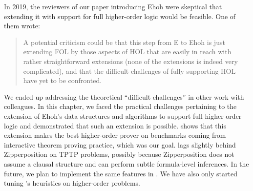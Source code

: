  In 2019, the reviewers of our paper introducing Ehoh \cite{vbss-19-ehoh1} were
  skeptical that extending it with support for full higher-order logic would be
  feasible. One of them wrote:
  \begin{quote}
  A potential criticism could be that this step from E to Ehoh is just extending
  FOL by those aspects of HOL that are easily in reach with rather straightforward
  extensions (none of the extensions is indeed very complicated), and that the
  difficult challenges of fully supporting HOL have yet to be confronted.
  \end{quote}
  We ended up addressing the theoretical ``difficult challenges'' in other work
  with colleagues. In this chapter, we faced the practical challenges pertaining to the extension
  of Ehoh's data structures and algorithms to support full higher-order logic and
  demonstrated that such an extension is possible.  shows
  that this extension makes \ehohii{} the best higher-order prover on
  benchmarks coming from interactive theorem proving practice, which was our goal. \ehohii{}
  lags slightly behind Zipperposition on TPTP problems, possibly because Zipperposition
  does not assume a clausal structure and can perform subtle formula-level
  inferences. In the future, we plan to implement the same features in \ehohii{}.
  We have also only started tuning \ehohii{}'s heuristics on higher-order
  problems.
